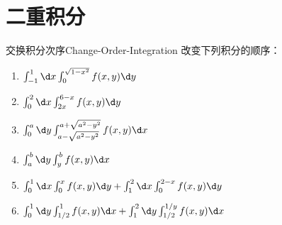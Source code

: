 \section{二重积分}

\begin{problem}{交换积分次序}{Change-Order-Integration}
    改变下列积分的顺序：
    \begin{enumerate}
        \item $\int_{-1}^{1} \d x \int_{0}^{\sqrt{1-x^2}} f(x, y) \d y$
        \item $\int_{0}^{2} \d x \int_{2x}^{6-x} f(x, y) \d y$
        \item $\int_{0}^{a} \d y \int_{a-\sqrt{a^2-y^2}}^{a+\sqrt{a^2-y^2}} f(x, y) \d x$
        \item $\int_{a}^{b} \d y \int_{y}^{b} f(x, y) \d x$
        \item $\int_{0}^{1} \d x \int_{0}^{x} f(x, y) \d y + \int_{1}^{2} \d x \int_{0}^{2-x} f(x, y) \d y$
        \item $\int_{0}^{1} \d y \int_{1/2}^{1} f(x, y) \d x + \int_{1}^{2} \d y \int_{1/2}^{1/y} f(x, y) \d x$
    \end{enumerate}
\end{problem}

